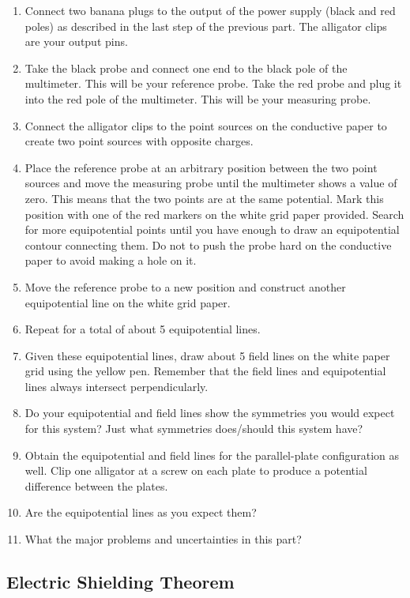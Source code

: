 \begin{enumerate}
    \item Connect two banana plugs to the output of the power supply (black and red poles) as described in the last step of the previous part. The alligator clips are your output pins.
    \item Take the black probe and connect one end to the black pole of the multimeter. This will be your reference probe. Take the red probe and plug it into the red pole of the multimeter. This will be your measuring probe.
    \item Connect the alligator clips to the point sources on the conductive paper to create two point sources with opposite charges.
    \item Place the reference probe at an arbitrary position between the two point sources and move the measuring probe until the multimeter shows a value of zero. This means that the two points are at the same potential. Mark this position with one of the red markers on the white grid paper provided. Search for more equipotential points until you have enough to draw an equipotential contour connecting them. Do not to push the probe hard on the conductive paper to avoid making a hole on it. 
    \item Move the reference probe to a new position and construct another equipotential line on the white grid paper.
    \item Repeat for a total of about 5 equipotential lines.
    \item Given these equipotential lines, draw about 5 field lines on the white paper grid using the yellow pen. Remember that the field lines and equipotential lines always intersect perpendicularly.
    \item Do your equipotential and field lines show the symmetries you would expect for this system? Just what symmetries does/should this system have?
    \item Obtain the equipotential and field lines for the parallel-plate configuration as well. Clip one alligator at a screw on each plate to produce a potential difference between the plates.
    \item Are the equipotential lines as you expect them?
    \item What the major problems and uncertainties in this part?
\end{enumerate}

\subsection{Electric Shielding Theorem}

